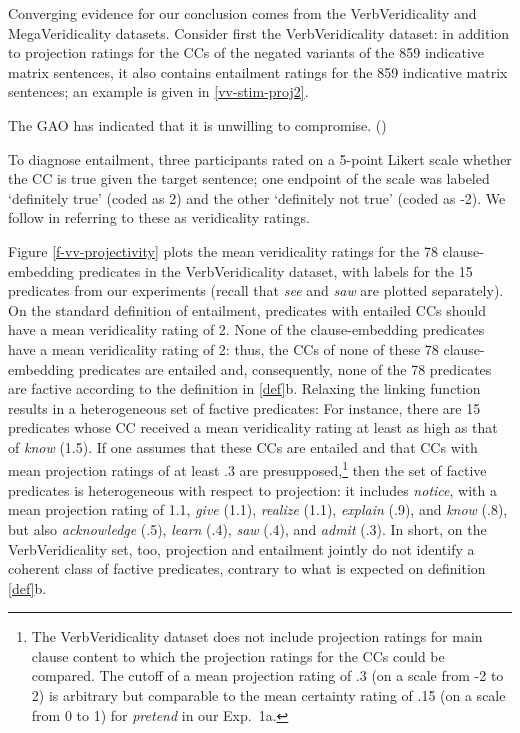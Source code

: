 \documentclass{language}
\newcommand{\6}{\mbox{$[\hspace*{-.6mm}[$}}
\newcommand{\9}{\mbox{$]\hspace*{-.6mm}]$}}
\begin{document}
Converging evidence for our conclusion comes from the VerbVeridicality and MegaVeridicality datasets. Consider first the VerbVeridicality dataset: in addition to projection ratings for the CCs of the negated variants of the 859 indicative matrix sentences, it also contains entailment ratings for the 859 indicative matrix sentences; an example is given in \ref{vv-stim-proj2}. 

\begin{exe}
\ex\label{vv-stim-proj2} The GAO has indicated that it is unwilling to compromise.  \hfill (\citealt[2234]{ross-pavlick2019})
\end{exe}
To diagnose entailment, three participants rated on a 5-point Likert scale whether the CC is true given the target sentence; one endpoint of the scale was labeled `definitely true' (coded as 2) and the other `definitely not true' (coded as -2). We follow \citet{ross-pavlick2019} in referring to these as {\sc veridicality ratings}. 

Figure \ref{f-vv-projectivity} plots the mean veridicality ratings for the 78 clause-embedding predicates in the VerbVeridicality dataset, with labels for the 15 predicates from our experiments (recall that {\em see} and {\em saw} are plotted separately). On the standard definition of entailment, predicates with entailed CCs should have a mean veridicality rating of 2. None of the clause-embedding predicates have a mean veridicality rating of 2: thus, the CCs of none of these 78 clause-embedding predicates are entailed and, consequently, none of the 78 predicates are factive according to the definition in \ref{def}b. Relaxing the linking function results in a heterogeneous set of factive predicates: For instance, there are 15 predicates whose CC received a mean veridicality rating at least as high as that of {\em know} (1.5). If one assumes that these CCs are entailed and that CCs with mean projection ratings of at least .3 are presupposed,\footnote{The VerbVeridicality dataset does not include projection ratings for main clause content to which the projection ratings for the CCs could be compared. The cutoff of a mean projection rating of .3 (on a scale from -2 to 2) is arbitrary but comparable to the mean certainty rating of .15 (on a scale from 0 to 1) for {\em pretend} in our Exp.~1a.} then the set of factive predicates is heterogeneous with respect to projection: it includes {\em notice}, with a mean projection rating of 1.1, {\em give} (1.1), {\em realize} (1.1), {\em explain} (.9), and {\em know} (.8), but also {\em acknowledge} (.5), {\em learn} (.4), {\em saw} (.4), and {\em admit} (.3). In short, on the VerbVeridicality set, too, projection and entailment jointly do not identify a coherent class of factive predicates, contrary to what is expected on definition \ref{def}b.
\end{document}
